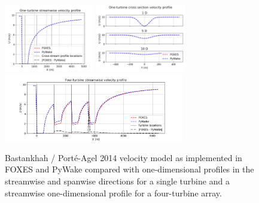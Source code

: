 \documentclass{iopconfser}
\begin{document}
\begin{figure}[]
\centering
\includegraphics[width=0.35\textwidth]{figures/b2014 1t x.png}
\includegraphics[width=0.35\textwidth]{figures/b2014 1t y.png}
\\
\includegraphics[width=0.7\textwidth]{figures/b2014 4t.png}
\caption{Bastankhah / Porté-Agel 2014 velocity model as implemented in FOXES and PyWake compared with one-dimensional profiles in the streamwise and spanwise directions for a single turbine and a streamwise one-dimensional profile for a four-turbine array.}
\label{fig:b2014}
\end{figure}
\end{document}

